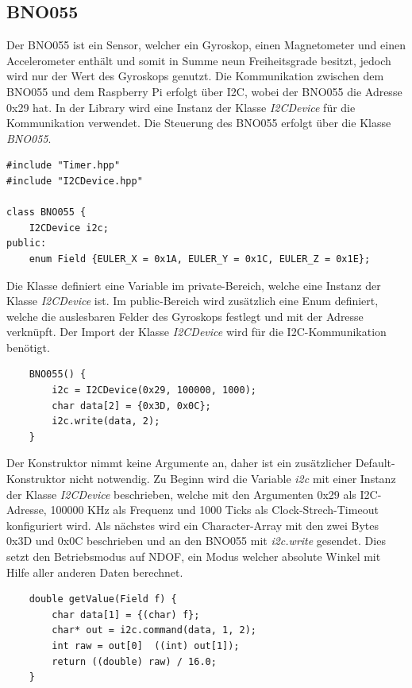 \documentclass[12pt]{article}
\begin{document}
\subsection{BNO055}
Der BNO055 ist ein Sensor, welcher ein Gyroskop, einen Magnetometer und einen Accelerometer enthält und somit in Summe neun Freiheitsgrade besitzt, jedoch wird nur der Wert des Gyroskops genutzt. Die Kommunikation zwischen dem BNO055 und dem Raspberry Pi erfolgt über I2C, wobei der BNO055 die Adresse 0x29 hat. In der Library wird eine Instanz der Klasse \textit{I2CDevice} für die Kommunikation verwendet. Die Steuerung des BNO055 erfolgt über die Klasse \textit{BNO055}.\\
\begin{verbatim}
#include "Timer.hpp"
#include "I2CDevice.hpp"

class BNO055 {
    I2CDevice i2c;
public:
    enum Field {EULER_X = 0x1A, EULER_Y = 0x1C, EULER_Z = 0x1E};
\end{verbatim}
\vspace{-2mm}
Die Klasse definiert eine Variable im private-Bereich, welche eine Instanz der Klasse \textit{I2CDevice} ist. Im public-Bereich wird zusätzlich eine Enum definiert, welche die auslesbaren Felder des Gyroskops festlegt und mit der Adresse verknüpft. Der Import der Klasse \textit{I2CDevice} wird für die I2C-Kommunikation benötigt.\\
\begin{verbatim}
    BNO055() {
        i2c = I2CDevice(0x29, 100000, 1000);
        char data[2] = {0x3D, 0x0C};
        i2c.write(data, 2);
    }
\end{verbatim}
\vspace{-2mm}
Der Konstruktor nimmt keine Argumente an, daher ist ein zusätzlicher Default-Konstruktor nicht notwendig. Zu Beginn wird die Variable \textit{i2c} mit einer Instanz der Klasse \textit{I2CDevice} beschrieben, welche mit den Argumenten 0x29 als I2C-Adresse, 100000 KHz als Frequenz und 1000 Ticks als Clock-Strech-Timeout konfiguriert wird. Als nächstes wird ein Character-Array mit den zwei Bytes 0x3D und 0x0C beschrieben und an den BNO055 mit \textit{i2c.write} gesendet. Dies setzt den Betriebsmodus auf NDOF, ein Modus welcher absolute Winkel mit Hilfe aller anderen Daten berechnet. \\
\begin{verbatim}
    double getValue(Field f) {
        char data[1] = {(char) f};
        char* out = i2c.command(data, 1, 2);
        int raw = out[0]  ((int) out[1]);
        return ((double) raw) / 16.0;
    }
\end{verbatim}
\end{document}
